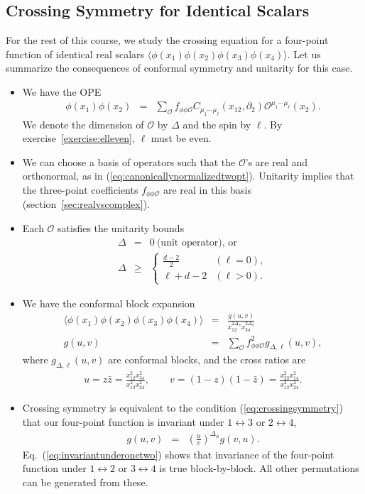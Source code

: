 \documentclass{ws-rv9x6}
\newcommand\be{\begin{eqnarray}}
\newcommand\ee{\end{eqnarray}}
\newcommand\f\phi
\newcommand\cO{\mathcal{O}}
\newcommand\p[1]{\left(#1\right)}
\newcommand\ptl\partial
\newcommand\<\langle
\renewcommand\>\rangle
\newcommand\nn{\nonumber}
\renewcommand\.{\cdot}
\newcommand\De{\Delta}
\begin{document}
\subsection{Crossing Symmetry for Identical Scalars} 

For the rest of this course, we study the crossing equation for a four-point function of identical real scalars $\<\f(x_1)\f(x_2)\f(x_3)\f(x_4)\>$.  Let us summarize the consequences of conformal symmetry and unitarity for this case.
\begin{itemize}
\item We have the OPE
\be
\f(x_1)\f(x_2) &=& \sum_{\cO} f_{\f\f\cO} C_{\mu_1\cdots\mu_\ell}(x_{12},\ptl_2) \cO^{\mu_1\cdots\mu_\ell}(x_2).
\ee
We denote the dimension of $\cO$ by $\De$ and the spin by $\ell$. By exercise~\ref{exercise:elleven}, $\ell$ must be even.

\item We can choose a basis of operators such that the $\cO$'s are real and orthonormal, as in  (\ref{eq:canonicallynormalizedtwopt}).  Unitarity implies that the three-point coefficients $f_{\f\f\cO}$ are real in this basis (section~\ref{sec:realvscomplex}).

\item Each $\cO$ satisfies the unitarity bounds
\be
\label{eq:unitarityboundsummary}
\De &=& 0 \ \textrm{(unit operator), or}\nn\\
\De &\geq& \left\{
\begin{array}{ll}
\frac{d-2}{2} & (\ell=0),\\
\ell+d-2 & (\ell > 0).
\end{array}
\right.
\ee

\item We have the conformal block expansion
\be
\<\f(x_1)\f(x_2)\f(x_3)\f(x_4)\> &=& \frac{g(u,v)}{x_{12}^{2\De_\f}x_{34}^{2\De_\f}}\\
g(u,v) &=& \sum_\cO f_{\f\f\cO}^2 g_{\De,\ell}(u,v),
\ee
where $g_{\De,\ell}(u,v)$ are conformal blocks, and the cross ratios are
\be
u = z\bar z = \frac{x_{12}^2 x_{34}^2}{x_{13}^2 x_{24}^2},\qquad v=(1-z)(1-\bar z) =\frac{x_{23}^2 x_{14}^2}{x_{13}^2 x_{24}^2}.
\ee


\item Crossing symmetry is equivalent to the condition (\ref{eq:crossingsymmetry}) that our four-point function is invariant under $1\leftrightarrow 3$ or $2\leftrightarrow 4$,
\be
\label{eq:crossingeqsummary}
g(u,v) &=& \p{\frac{u}{v}}^{\De_\f} g(v,u).
\ee
Eq.~(\ref{eq:invariantunderonetwo}) shows that invariance of the four-point function under $1\leftrightarrow 2$ or $3\leftrightarrow 4$ is true block-by-block.  All other permutations can be generated from these.

\end{itemize}
\end{document}
